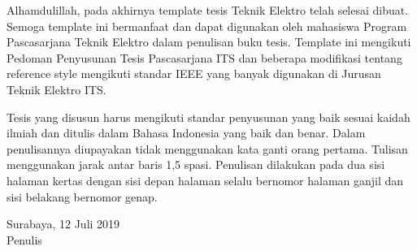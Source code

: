 \begin{spacing}{1.5}

Alhamdulillah, pada akhirnya template tesis Teknik Elektro telah selesai dibuat. Semoga template ini bermanfaat dan dapat digunakan oleh mahasiswa Program Pascasarjana Teknik Elektro dalam penulisan buku tesis. Template ini mengikuti Pedoman Penyusunan Tesis Pascasarjana ITS dan beberapa modifikasi tentang reference style mengikuti standar IEEE yang banyak digunakan di Jurusan Teknik Elektro ITS.

Tesis yang disusun harus mengikuti standar penyusunan yang baik sesuai kaidah ilmiah dan ditulis dalam Bahasa Indonesia yang baik dan benar. Dalam penulisannya diupayakan tidak menggunakan kata ganti orang pertama. Tulisan menggunakan jarak antar baris 1,5 spasi. Penulisan dilakukan pada dua sisi halaman kertas dengan sisi depan halaman selalu bernomor halaman ganjil dan sisi belakang bernomor genap.

\vspace{6ex}
\noindent Surabaya, 12 Juli 2019 \\ Penulis
\end{spacing}